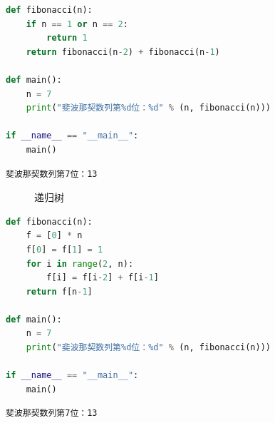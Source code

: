 
\begin{lstlisting}[language=Python]
def fibonacci(n):
	if n == 1 or n == 2:
		return 1
	return fibonacci(n-2) + fibonacci(n-1)

def main():
	n = 7
	print("斐波那契数列第%d位：%d" % (n, fibonacci(n)))

if __name__ == "__main__":
	main()
\end{lstlisting}

\begin{tcolorbox}
	\begin{verbatim}
斐波那契数列第7位：13
\end{verbatim}
\end{tcolorbox}

\begin{figure}[H]
	\centering
	\caption{递归树}
\end{figure}


\begin{lstlisting}[language=Python]
def fibonacci(n):
	f = [0] * n
	f[0] = f[1] = 1
	for i in range(2, n):
		f[i] = f[i-2] + f[i-1]
	return f[n-1]

def main():
	n = 7
	print("斐波那契数列第%d位：%d" % (n, fibonacci(n)))

if __name__ == "__main__":
	main()
\end{lstlisting}

\begin{tcolorbox}
	\begin{verbatim}
斐波那契数列第7位：13
\end{verbatim}
\end{tcolorbox}

